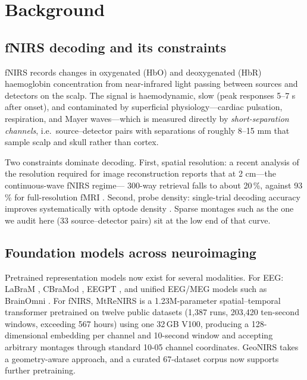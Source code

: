 \section{Background}
\label{sec:background}

\subsection{fNIRS decoding and its constraints}
fNIRS records changes in oxygenated (HbO) and deoxygenated (HbR) haemoglobin concentration from
near-infrared light passing between sources and detectors on the scalp. The signal is
haemodynamic, slow (peak responses 5--7 s after onset), and contaminated by superficial
physiology---cardiac pulsation, respiration, and Mayer waves---which is measured directly by
\emph{short-separation channels}, i.e.\ source--detector pairs with separations of roughly
8--15 mm that sample scalp and skull rather than cortex.

Two constraints dominate decoding. First, spatial resolution: a recent analysis of the resolution
required for image reconstruction reports that at 2 cm---the continuous-wave fNIRS regime---
300-way retrieval falls to about 20\,\%, against 93\,\% for full-resolution fMRI
\citep{adamic2024resolution}. Second, probe density: single-trial decoding accuracy improves
systematically with optode density \citep{fischer2026density}. Sparse montages such as the one we
audit here (33 source--detector pairs) sit at the low end of that curve.

\subsection{Foundation models across neuroimaging}
Pretrained representation models now exist for several modalities. For EEG: LaBraM
\citep{bi2024labram}, CBraMod \citep{wang2025cbramod}, EEGPT \citep{wang2024eegpt}, and unified
EEG/MEG models such as BrainOmni \citep{brainomni2025}. For fNIRS, MtReNIRS
\citep{chae2026mtrenirs} is a 1.23M-parameter spatial--temporal transformer pretrained on twelve
public datasets (1{,}387 runs, 203{,}420 ten-second windows, exceeding 567 hours) using one
32\,GB V100, producing a 128-dimensional embedding per channel and 10-second window and accepting
arbitrary montages through standard 10-05 channel coordinates. GeoNIRS \citep{geonirs2026} takes
a geometry-aware approach, and a curated 67-dataset corpus \citep{sposso2026corpus} now supports
further pretraining.

